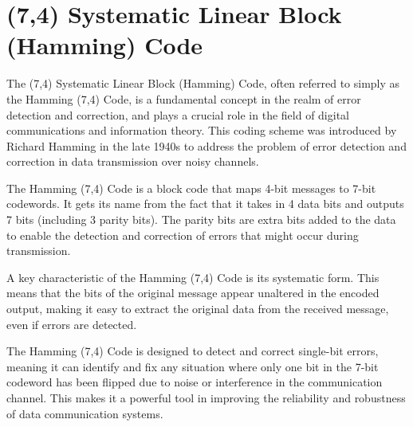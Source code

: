 \documentclass{article}
\begin{document}
\section{(7,4) Systematic Linear Block (Hamming) Code}
The (7,4) Systematic Linear Block (Hamming) Code, often referred to simply as the Hamming (7,4) Code, is a fundamental concept in the realm of error detection and correction, and plays a crucial role in the field of digital communications and information theory. This coding scheme was introduced by Richard Hamming in the late 1940s to address the problem of error detection and correction in data transmission over noisy channels.

The Hamming (7,4) Code is a block code that maps 4-bit messages to 7-bit codewords. It gets its name from the fact that it takes in 4 data bits and outputs 7 bits (including 3 parity bits). The parity bits are extra bits added to the data to enable the detection and correction of errors that might occur during transmission.

A key characteristic of the Hamming (7,4) Code is its systematic form. This means that the bits of the original message appear unaltered in the encoded output, making it easy to extract the original data from the received message, even if errors are detected. 

The Hamming (7,4) Code is designed to detect and correct single-bit errors, meaning it can identify and fix any situation where only one bit in the 7-bit codeword has been flipped due to noise or interference in the communication channel. This makes it a powerful tool in improving the reliability and robustness of data communication systems.
\end{document}
